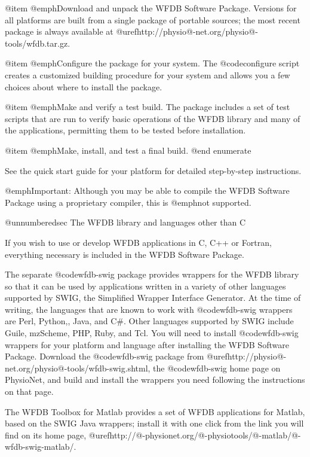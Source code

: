 {{{{{{{{@item
@emph{Download and unpack the WFDB Software Package.}  Versions for all
platforms are built from a single package of portable sources;  the most
recent package is always available at
@uref{http://physio@-net.org/physio@-tools/wfdb.tar.gz}.

@item
@emph{Configure the package for your system.}  The @code{configure} script
creates a customized building procedure for your system and allows you
a few choices about where to install the package.

@item
@emph{Make and verify a test build.}  The package includes a set of test
scripts that are run to verify basic operations of the WFDB library and
many of the applications, permitting them to be tested before installation.

@item
@emph{Make, install, and test a final build.}
@end enumerate

See the quick start guide for your platform for detailed step-by-step
instructions.

@emph{Important:} Although you may be able to compile the WFDB Software Package
using a proprietary compiler, this is @emph{not supported}.

@unnumberedsec The WFDB library and languages other than C

If you wish to use or develop WFDB applications in C, C++ or Fortran,
everything necessary is included in the WFDB Software Package.

The separate @code{wfdb-swig} package provides wrappers for the WFDB library
so that it can be used by applications written in a variety of other languages
supported by SWIG, the Simplified Wrapper Interface Generator.  At the time
of writing, the languages that are known to work with @code{wfdb-swig} wrappers
are Perl, Python,, Java, and C#.  Other languages supported by SWIG include
Guile, mzScheme, PHP, Ruby, and Tcl. You will need to install @code{wfdb-swig}
wrappers for your platform and language after installing the WFDB Software
Package.  Download the @code{wfdb-swig} package from
@uref{http://physio@-net.org/physio@-tools/wfdb-swig.shtml}, the
@code{wfdb-swig} home page on PhysioNet, and build and install the wrappers
you need following the instructions on that page.

The WFDB Toolbox for Matlab provides a set of WFDB applications for Matlab,
based on the SWIG Java wrappers;  install it with one click from the link
you will find on its home page, 
@uref{http://@-physionet.org/@-physiotools/@-matlab/@-wfdb-swig-matlab/}.

}}}}}}}}
